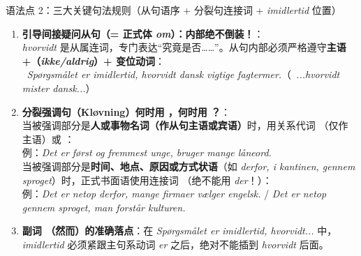\begin{grammatikbox}{语法点 2：三大关键句法规则（从句语序 + 分裂句连接词 + \textit{imidlertid} 位置）}
\begin{enumerate}
  \item \textbf{ 引导间接疑问从句（= 正式体 \textit{om}）：内部绝不倒装！}：\\
    \textit{hvorvidt} 是从属连词，专门表达“究竟是否……”。从句内部必须严格遵守\textbf{主语 +（\textit{ikke/aldrig}）+ 变位动词}：\\
    \ \textit{Spørgsmålet er imidlertid, hvorvidt dansk  vigtige fagtermer.}（\ \textit{...hvorvidt mister dansk...}）
  \item \textbf{分裂强调句（Kløvning）何时用 ，何时用 ？}：\\
     当被强调部分是\textbf{人或事物名词（作从句主语或宾语）}时，用关系代词 （仅作主语）或 ：\\
    例：\textit{Det er først og fremmest unge,  bruger mange låneord.}\\
     当被强调部分是\textbf{时间、地点、原因或方式状语}（如 \textit{derfor, i kantinen, gennem sproget}）时，正式书面语使用连接词 （绝不能用 \textit{der}！）：\\
    例：\textit{Det er netop derfor,  mange firmaer vælger engelsk.} / \textit{Det er netop gennem sproget,  man forstår kulturen.}
  \item \textbf{副词 （然而）的准确落点}：在 \textit{Spørgsmålet er imidlertid, hvorvidt...} 中，\textit{imidlertid} 必须紧跟主句系动词 \textit{er} 之后，绝对不能插到 \textit{hvorvidt} 后面。
\end{enumerate}
\end{grammatikbox}

